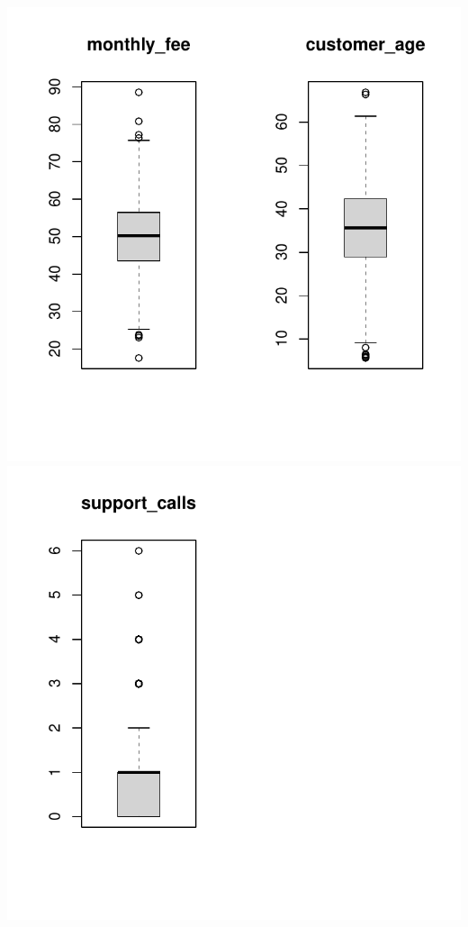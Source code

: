 \documentclass[
]{article}
\begin{document}
\includegraphics{3_logistic_regression_files/figure-latex/visualization_boxplot-1.pdf}
\includegraphics{3_logistic_regression_files/figure-latex/visualization_boxplot-2.pdf}
\end{document}
